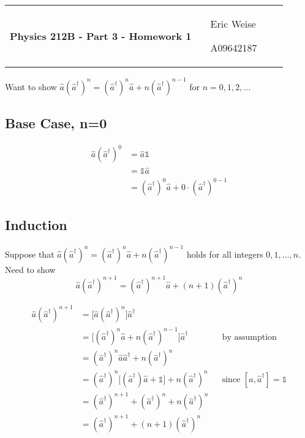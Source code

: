 \documentclass{article}
\newcommand{\assignment}[1]{
    \newpage
    \begin{tabular}{p{0.65\linewidth}p{0.25\linewidth}}
        {\bf\LARGE Physics 212B - Part 3 - Homework #1 }
        &
        \parbox[b]{0.24\textwidth}{
            \hfill Eric Weise

            \hfill A09642187
            }
    \end{tabular}
    \vspace{12pt}
    \newline
}
\renewcommand{\RAISE}[0]{\hat{a}^{\dagger}}
\renewcommand{\LOWER}[0]{\hat{a}}
\begin{document}
\assignment{1}
Want to show 
\( \LOWER(\RAISE)^n = (\RAISE)^n\LOWER + n(\RAISE)^{n-1} \)
for $n=0,1,2,...$

\subsection*{Base Case, n=0}
\begin{align*}
    \LOWER(\RAISE)^0
    &= \LOWER \mathbb{1} \\
    &= \mathbb{1} \LOWER \\
    &= (\RAISE)^0 \LOWER + 0 \cdot (\RAISE)^{0-1}
\end{align*}

\subsection*{Induction}
Suppose that
\( \LOWER(\RAISE)^n = (\RAISE)^n\LOWER + n(\RAISE)^{n-1} \)
holds for all integers $0,1,\ldots,n$.
Need to show
\[ \LOWER(\RAISE)^{n+1} = (\RAISE)^{n+1}\LOWER + (n+1)(\RAISE)^n \]

\begin{align*}
    \LOWER(\RAISE)^{n+1}
    &= \big[ \LOWER(\RAISE)^n \big] \RAISE \\
    &= \big[ (\RAISE)^n\LOWER + n(\RAISE)^{n-1} \big] \RAISE
        && \text{by assumption}\\
    &= (\RAISE)^n \LOWER \RAISE + n (\RAISE)^n \\
    &= (\RAISE)^n \big[ (\RAISE)\LOWER + \mathbb{1} \big] + n(\RAISE)^n
        && \text{since }[\LOWER,\RAISE] = \mathbb{1} \\
    &= (\RAISE)^{n+1} + (\RAISE)^n + n(\RAISE)^n \\
    &= (\RAISE)^{n+1} + (n+1)(\RAISE)^n \\
\end{align*}
\end{document}
